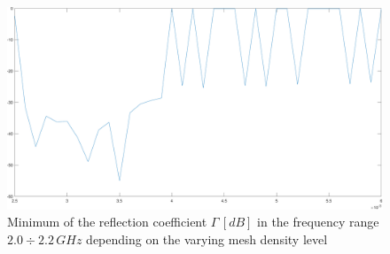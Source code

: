 \documentclass[12pt,a4paper]{article}
\begin{document}
{\begin{figure}[h]
\begin{center}
		\includegraphics[scale=0.3]{mesh_first_test.pdf}
		\caption{{Minimum of the reflection coefficient $\Gamma\, [dB]$ in the frequency range $2.0\div 2.2\,GHz$ depending on the varying mesh density level}}
		\label{fig:first mesh test}
\end{center}

	\end{figure}

}
\end{document}

